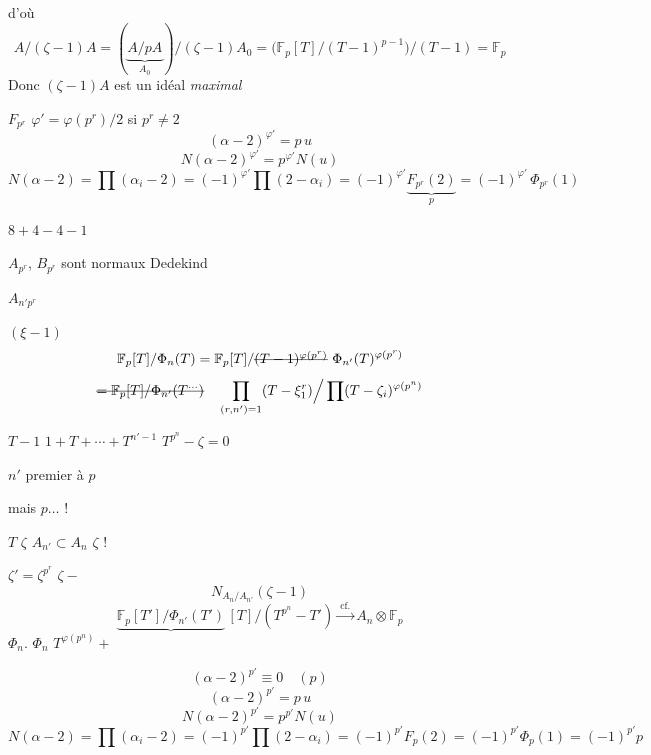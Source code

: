 \documentclass[11pt,a4paper]{article}
\begin{document}
d'où
\[
A/(\zeta-1)A = (\underbrace{A/pA}_{A_0})/(\zeta-1)A_0 = \bigl(\mathbb{F}_p[T]/(T-1)^{p-1}\bigr)/(T-1) = \mathbb{F}_p
\]
Donc $(\zeta-1)A$ est un idéal \emph{maximal}

$F_{p^r}$ \qquad $\varphi' = \varphi(p^r)/2$ \quad si $p^r\neq 2$
\[
(\alpha-2)^{\varphi'} = p\,u
\]
\[
N(\alpha-2)^{\varphi'} = p^{\varphi'} N(u)
\]
\[
N(\alpha-2) = \prod(\alpha_i-2) = (-1)^{\varphi'}\prod(2-\alpha_i) = (-1)^{\varphi'} \underbrace{F_{p^r}(2)}_{p} = (-1)^{\varphi'}\,\Phi_{p^r}(1)
\]

$8+4-4-1$

 \quad $A_{p^r}$, $B_{p^r}$ sont normaux  Dedekind

$A_{n'p^r}$

$(\xi-1)$
\[
\mathbb{F}_p[T]/\Phi_n(T) = \mathbb{F}_p[T]/\text{\struck{$(T-1)^{\varphi(p^r)}$}}\ \Phi_{n'}(T)^{\varphi(p^r)}
\]
\[
\text{\struck{$=\mathbb{F}_p[T]/\Phi_{n'}(T^{\cdots})$}} \quad \prod_{(r,n')=1}(T-\xi_1^r)\Big/\prod(T-\zeta_i)^{\varphi(p^n)}
\]

$T-1$ \qquad {} \quad $1+T+\cdots+T^{n'-1}$ \qquad $T^{p^n}-\zeta = 0$

$n'$ premier à $p$

mais  \ill{}  $p\ldots$ !

$T$ \quad $\zeta$ \quad $A_{n'}\subset A_n$ \qquad $\zeta$ !

$\zeta' = \zeta^{p^r}$ \qquad $\zeta-$ \qquad {}
\[
N_{A_n/A_{n'}}(\zeta-1)
\]
\[
\underbrace{\mathbb{F}_p[T']/\Phi_{n'}(T')}\,[T]/(T^{p^n}-T') \xrightarrow{\ \text{cf.}\ } A_n\otimes\mathbb{F}_p
\]
 \ill{}  $\Phi_n$. \quad \struck{\ill{}} $\Phi_n$ \quad $T^{\varphi(p^n)}+$

\[
(\alpha-2)^{p'} \equiv 0 \quad (p)
\]
\[
(\alpha-2)^{p'} = p\,u
\]
\[
N(\alpha-2)^{p'} = p^{p'} N(u)
\]
\[
N(\alpha-2) = \prod(\alpha_i-2) = (-1)^{p'}\prod(2-\alpha_i) = (-1)^{p'} F_p(2) = (-1)^{p'}\Phi_p(1) = (-1)^{p'}p
\]
\end{document}
